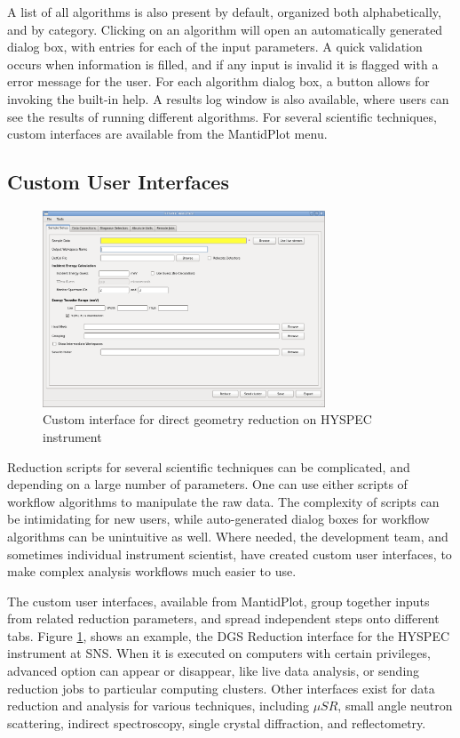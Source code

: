 \documentclass{elsarticle}
\begin{document}
A list of all algorithms is also present by default, organized both alphabetically, and by category. Clicking on an algorithm will open an automatically generated dialog box, with entries for each of the input parameters. A quick validation occurs when information is filled, and if any input is invalid it is flagged with a error message for the user. For each algorithm dialog box, a button allows for invoking the built-in help. A results log window is also available, where users can see the results of running different algorithms. For several scientific techniques, custom interfaces are available from the MantidPlot menu.


\subsection{Custom User Interfaces}
\begin{figure}[!ht]
\centerline{\includegraphics[width=0.75\textwidth]{Hyspec.png}}
\caption{Custom interface for direct geometry reduction on HYSPEC instrument}
\label{fig:Hyspec}
\end{figure}
Reduction scripts for several scientific techniques can be complicated, and depending on a large number of parameters. One can use either scripts of workflow algorithms to manipulate the raw data. The complexity of scripts can be intimidating for new users, while auto-generated dialog boxes for workflow algorithms can be unintuitive as well. Where needed, the development team, and sometimes individual instrument scientist, have created custom user interfaces, to make complex analysis workflows much easier to use.

The custom user interfaces, available from MantidPlot, group together inputs from related reduction parameters, and spread independent steps onto different tabs. Figure \ref{fig:Hyspec}, shows an example, the DGS Reduction interface for the HYSPEC instrument at SNS. When it is executed on computers with certain privileges, advanced option can appear or disappear, like live data analysis, or sending reduction jobs to particular computing clusters.
Other interfaces exist for data reduction and analysis for various techniques, including $\mu SR$\cite{musr}, small angle neutron scattering, indirect spectroscopy, single crystal diffraction, and reflectometry.
\end{document}
